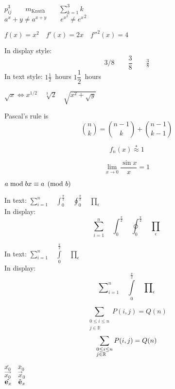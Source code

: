 \documentclass[]{ctexart}
\begin{document}

	$p^3_{ij} \qquad
	m_\mathrm{Knuth}\qquad
	\sum_{k=1}^3 k $\\[5pt]
	$a^x+y \neq a^{x+y}\qquad
	e^{x^2} \neq {e^x}^2$

	$f(x) = x^2 \quad f'(x)
	= 2x \quad f''^{2}(x) = 4$

	In display style:
	\[
		3/8 \qquad \frac{3}{8}
		\qquad \tfrac{3}{8}
	\]
	In text style:
	$1\frac{1}{2}$~hours \qquad
	$1\dfrac{1}{2}$~hours

	$\sqrt{x} \Leftrightarrow x^{1/2}
	\quad \sqrt[3]{2}
	\quad \sqrt{x^{2} + \sqrt{y}}$

	Pascal's rule is
	\[
		\binom{n}{k} =\binom{n-1}{k}
		+ \binom{n-1}{k-1}
	\]

	\[
		f_n(x) \stackrel{*}{\approx} 1
	\]

	\[
		\lim_{x \rightarrow 0}
		\frac{\sin x}{x}=1
	\]


	$a\bmod b \\
	x\equiv a \pmod{b}$


	In text:
	$\sum_{i=1}^n \quad
	\int_0^{\frac{\pi}{2}} \quad
	\oint_0^{\frac{\pi}{2}} \quad
	\prod_\epsilon $ \\

	In display:
	\[\sum_{i=1}^n \quad
	\int_0^{\frac{\pi}{2}} \quad
	\oint_0^{\frac{\pi}{2}} \quad
	\prod_\epsilon \]

	In text:
	$\sum\limits_{i=1}^n \quad
	\int\limits_0^{\frac{\pi}{2}} \quad
	\prod\limits_\epsilon $ \\
	In display:
	\[\sum\nolimits_{i=1}^n \quad
	\int\limits_0^{\frac{\pi}{2}} \quad
	\prod\nolimits_\epsilon \]

	\[
		\sum_{\substack{0\le i\le n \\
		j\in \mathbb{R}}}
		P(i,j) = Q(n)
	\]
	\[
		\sum_{\begin{subarray}{l}
				  0\le i\le n \\
				  j\in \mathbb{R}
		\end{subarray}}
		P(i,j) = Q(n)
	\]

	$\bar{x_0} \quad \bar{x}_0$\\[5pt]
	$\vec{x_0} \quad \vec{x}_0$\\[5pt]
	$\hat{\mathbf{e}_x} \quad{\tiny}
	\hat{\mathbf{e}}_x$
\end{document}
